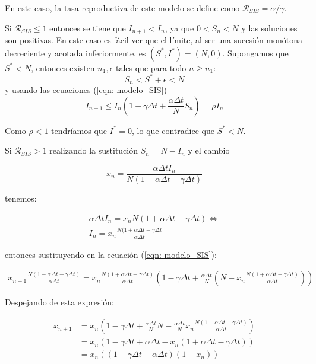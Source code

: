En este caso, la tasa reproductiva de este modelo se define como $\mathcal{R}_{SIS}=\alpha /\gamma$.

Si $\mathcal{R}_{SIS}\leq 1$ entonces se tiene que $I_{n+1} < I_n$, ya que $0<S_n<N$ y las soluciones son positivas. En este caso es fácil ver que el límite, al ser una sucesión monótona decreciente y acotada inferiormente, es $(S^*,I^*)=(N,0)$. Supongamos que $S^*<N$, entonces existen $n_1, \epsilon$ tales que para todo $n \geq n_1$:
$$S_n<S^*+\epsilon < N$$
y usando las ecuaciones (\ref{eqn: modelo_SIS})
$$I_{n+1} \leq I_n \left( 1-\gamma \Delta t + \frac{\alpha\Delta t}{N} S_n \right) = \rho I_n$$

Como $\rho < 1$ tendríamos que $I^*=0$, lo que contradice que $S^*<N$.

Si $\mathcal{R}_{SIS}>1$ realizando la sustitución $S_n=N-I_n$ y el cambio

$$x_n=\frac{\alpha \Delta t I_n}{N(1+\alpha \Delta t - \gamma \Delta t)}$$

tenemos:

\begin{equation}
\begin{aligned}
\alpha\Delta t I_n = x_nN(1+\alpha\Delta t-\gamma\Delta t) \Leftrightarrow \\
I_n = x_n\frac{N(1+\alpha\Delta t - \gamma\Delta t}{\alpha\Delta t}
\end{aligned}
\end{equation}

entonces sustituyendo en la ecuación (\ref{eqn: modelo_SIS}):

\begin{equation}
\begin{aligned}
x_{n+1}\frac{N(1-\alpha\Delta t-\gamma\Delta t)}{\alpha \Delta t} = x_n\frac{N(1+\alpha\Delta t-\gamma \Delta t)}{\alpha\Delta t}\left( 1-\gamma\Delta t+\frac{\alpha\Delta t}{N}\left(N-x_n\frac{N(1+\alpha\Delta t-\gamma\Delta t)}{\alpha\Delta t}\right) \right)
\end{aligned}
\end{equation}

Despejando de esta expresión:

\begin{equation}
\begin{aligned}
x_{n+1} & = x_n\left( 1-\gamma\Delta t+\frac{\alpha\Delta t}{N}N-\frac{\alpha\Delta t}{N}x_n\frac{N(1+\alpha\Delta t -\gamma \Delta t)}{\alpha\Delta t} \right) \\
& = x_n(1-\gamma\Delta t + \alpha\Delta t -x_n(1+\alpha\Delta t -\gamma\Delta t)) \\
& = x_n((1-\gamma\Delta t+\alpha\Delta t)(1-x_n))
\end{aligned}
\end{equation}

